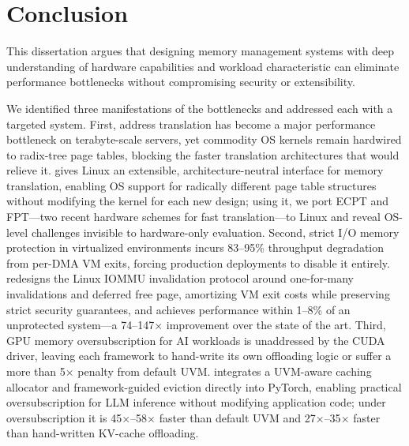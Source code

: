 \section{Conclusion}
\label{chp:conclusion}


This dissertation argues that 
designing memory management systems with deep understanding of hardware capabilities and workload characteristic 
can eliminate performance bottlenecks without compromising security or extensibility.

We identified three manifestations of the bottlenecks and addressed each with a targeted system.
First, address translation has become a major performance bottleneck on terabyte-scale
servers, yet commodity OS kernels remain hardwired to radix-tree page tables, blocking the
faster translation architectures that would relieve it.
\EMTbrand{} gives Linux an extensible, architecture-neutral interface for memory
translation, enabling OS support for radically different page table structures without
modifying the kernel for each new design; using it, we port ECPT and FPT---two recent
hardware schemes for fast translation---to Linux and reveal OS-level challenges invisible
to hardware-only evaluation.
Second, strict I/O memory protection in virtualized environments incurs 83--95\% throughput
degradation from per-DMA VM exits, forcing production deployments to disable it entirely.
\vFreebrand{} redesigns the Linux IOMMU invalidation protocol around one-for-many
invalidations and deferred free page, amortizing VM exit costs while preserving strict
security guarantees, and achieves performance within 1--8\% of an unprotected system---a
74--147$\times$ improvement over the state of the art.
Third, GPU memory oversubscription for AI workloads is unaddressed by the CUDA driver,
leaving each framework to hand-write its own offloading logic or suffer a more than
5$\times$ penalty from default UVM.
\pytorchUVMbrand{} integrates a UVM-aware caching allocator and framework-guided eviction
directly into PyTorch, enabling practical oversubscription for LLM inference without
modifying application code; under oversubscription it is 45$\times$--58$\times$ faster than
default UVM and 27$\times$--35$\times$ faster than hand-written KV-cache offloading.

